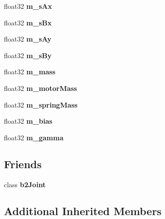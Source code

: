 \begin{DoxyCompactItemize}
\item 
\mbox{\label{classb2WheelJoint_a0935bcd6aea2145f6c8e947159a1e59b}} 
float32 {\bfseries m\+\_\+s\+Ax}
\item 
\mbox{\label{classb2WheelJoint_a0705a4e0dfd40bf25f518bb22d6e0177}} 
float32 {\bfseries m\+\_\+s\+Bx}
\item 
\mbox{\label{classb2WheelJoint_aaeb83f256ec67556cc1d7758f75b773e}} 
float32 {\bfseries m\+\_\+s\+Ay}
\item 
\mbox{\label{classb2WheelJoint_a4fa320609b2942eee344ac0d91003444}} 
float32 {\bfseries m\+\_\+s\+By}
\item 
\mbox{\label{classb2WheelJoint_a80abc7c0fe5a4d6f362ec5cb13214ec1}} 
float32 {\bfseries m\+\_\+mass}
\item 
\mbox{\label{classb2WheelJoint_a64d20e079b2638995c7faa5d3a2aed68}} 
float32 {\bfseries m\+\_\+motor\+Mass}
\item 
\mbox{\label{classb2WheelJoint_ab24b6e3ad48961de7d78e4476531dd30}} 
float32 {\bfseries m\+\_\+spring\+Mass}
\item 
\mbox{\label{classb2WheelJoint_a82bec93fb4a2a3702455bede3d5c6ac8}} 
float32 {\bfseries m\+\_\+bias}
\item 
\mbox{\label{classb2WheelJoint_a3d4c8b3e96b517d13693285e63a917fb}} 
float32 {\bfseries m\+\_\+gamma}
\end{DoxyCompactItemize}
\subsection*{Friends}
\begin{DoxyCompactItemize}
\item 
\mbox{\label{classb2WheelJoint_a2f8aeb7f12b8fbe115431953a4926eed}} 
class {\bfseries b2\+Joint}
\end{DoxyCompactItemize}
\subsection*{Additional Inherited Members}



